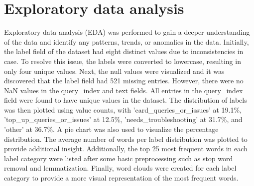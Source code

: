 \documentclass[12pt, a4paper]{article}
\begin{document}
\section{Exploratory data analysis}
Exploratory data analysis (EDA) was performed to gain a deeper understanding of the data and identify any patterns, trends, or anomalies in the data.
Initially, the label field of the dataset had eight distinct values due to inconsistencies in case. To resolve this issue, the labels were converted to lowercase, resulting in only four unique values.
Next, the null values were visualized and it was discovered that the label field had 521 missing entries. However, there were no NaN values in the query\_index and text fields. 
All entries in the query\_index field were found to have unique values in the dataset. \newline
The distribution of labels was then plotted using value counts, with 'card\_queries\_or\_issues' at 19.1\%, 'top\_up\_queries\_or\_issues' at 12.5\%, 'needs\_troubleshooting' at 31.7\%, and 'other' at 36.7\%. A pie chart was also used to visualize the percentage distribution. \newline
The average number of words per label distribution was plotted to provide additional insight.
Additionally, the top 25 most frequent words in each label category were listed after some basic preprocessing such as stop word removal and lemmatization.
Finally, word clouds were created for each label category to provide a more visual representation of the most frequent words.
\end{document}
